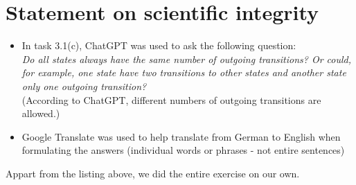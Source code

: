 \documentclass{article} %
\begin{document}
\section*{Statement on scientific integrity}
\begin{itemize}
    \item In task 3.1(c), ChatGPT was used to ask the
    following question:\\[0.3em]
    \textit{
        Do all states always have the same number of outgoing
        transitions? Or could, for example, one state have two
        transitions to other states and another state only one
        outgoing transition?
    }\\[0.3em] (According to ChatGPT, different numbers
    of outgoing transitions are allowed.)
    \item Google Translate was used to help translate from
    German to English when formulating the answers (individual
    words or phrases - not entire sentences)
\end{itemize}
Appart from the listing above, we did the entire exercise
on our own.
\end{document}
